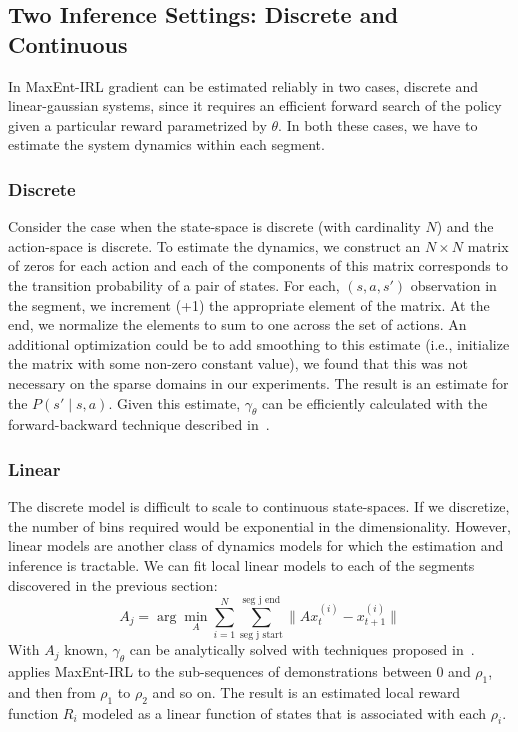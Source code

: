 \subsection{Two Inference Settings: Discrete and Continuous}
In MaxEnt-IRL gradient can be estimated reliably in two cases, discrete and linear-gaussian systems, since it requires an efficient forward search of the policy given a particular reward parametrized by $\theta$.
In both these cases, we have to estimate the system dynamics within each segment.

\subsubsection{Discrete}
Consider the case when the state-space is discrete (with cardinality $N$) and the action-space is discrete. 
To estimate the dynamics, we construct an $N \times N$ matrix of zeros for each action and each of the components 
of this matrix corresponds to the transition probability of a pair of states.
For each, $(s,a,s')$ observation in the segment, we increment (+1) the appropriate element of the matrix.
At the end, we normalize the elements to sum to one across the set of actions.
An additional optimization could be to add smoothing to this estimate (i.e., initialize the matrix with some non-zero constant value), we found that this was not necessary on the sparse domains in our experiments.
The result is an estimate for the $P(s' \mid s, a)$.
Given this estimate, $\gamma_{\theta}$ can be efficiently calculated with the forward-backward technique described in~\cite{DBLP:conf/aaai/ZiebartMBD08}.

\subsubsection{Linear}
The discrete model is difficult to scale to continuous state-spaces.
If we discretize, the number of bins required would be exponential in the dimensionality.
However, linear models are another class of dynamics models for which the estimation and inference is tractable.
We can fit local linear models to each of the segments discovered in the previous section:
\[
A_j = \arg\min_{A} \sum_{i=1}^N \sum_{\text{seg j start}}^{\text{seg j end}} \|A x^{(i)}_{t} - x^{(i)}_{t+1}\|
\]
With $A_j$ known, $\gamma_{\theta}$ can be analytically solved with techniques proposed in~\cite{ziebart2012probabilistic}.
\hirl applies MaxEnt-IRL to the sub-sequences of demonstrations between 0 and $\rho_1$, and then from $\rho_1$ to $\rho_2$ and so on.
The result is an estimated local reward function $R_{i}$ modeled as a linear function of states that is associated with each $\rho_i$.

